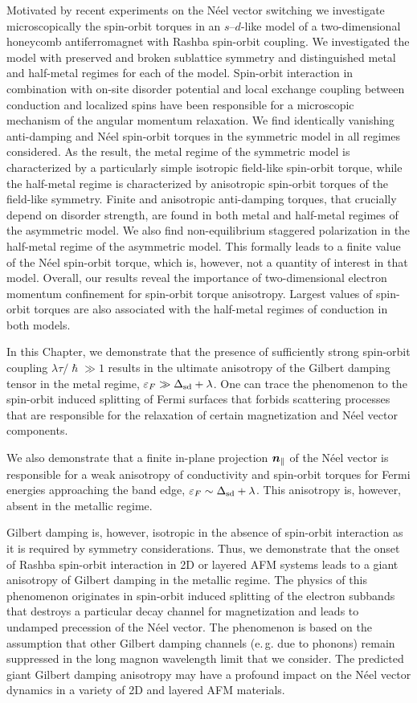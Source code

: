 Motivated by recent experiments on the N\'eel vector switching we investigate microscopically the spin-orbit torques in an $s$--$d$-like model of a two-dimensional honeycomb antiferromagnet with Rashba spin-orbit coupling. We investigated the model with preserved and broken sublattice symmetry and distinguished metal and half-metal regimes for each of the model. Spin-orbit interaction in combination with on-site disorder potential and local exchange coupling between conduction and localized spins have been responsible for a microscopic mechanism of the angular momentum relaxation. We find identically vanishing anti-damping and N\'eel spin-orbit torques in the symmetric model in all regimes considered. As the result, the metal regime of the symmetric model is characterized by a particularly simple isotropic field-like spin-orbit torque, while the half-metal regime is characterized by anisotropic spin-orbit torques of the field-like symmetry.  Finite and anisotropic anti-damping torques, that crucially depend on disorder strength, are found in both metal and half-metal regimes of the asymmetric model. We also find non-equilibrium staggered polarization in the half-metal regime of the asymmetric model. This formally leads to a finite value of the N\'eel spin-orbit torque, which is, however, not a quantity of interest in that model. Overall, our results reveal the importance of two-dimensional electron momentum confinement for spin-orbit torque anisotropy. Largest values of spin-orbit torques are also associated with the half-metal regimes of conduction in both models. 

In this Chapter, we demonstrate that the presence of sufficiently strong spin-orbit coupling $\lambda\tau/\hslash \gg 1$ results in the ultimate anisotropy of the Gilbert damping tensor in the metal regime, $\varepsilon_F\gg\Delta_{\text{sd}}+\lambda$.  One can trace the phenomenon to the spin-orbit induced splitting of Fermi surfaces that forbids scattering processes that are responsible for the relaxation of certain magnetization and N\'eel vector components. 

We also demonstrate that a finite in-plane projection $\boldsymbol{n}_\parallel$ of the N\'eel vector is responsible for a weak anisotropy of conductivity and spin-orbit torques for Fermi energies approaching the band edge, $\varepsilon_F \sim \Delta_{\text{sd}}+\lambda$. This anisotropy is, however, absent in the metallic regime. 

Gilbert damping is, however, isotropic in the absence of spin-orbit interaction as it is required by symmetry considerations. Thus, we demonstrate that the onset of Rashba spin-orbit interaction in 2D or layered AFM systems leads to a giant anisotropy of Gilbert damping in the metallic regime. The physics of this phenomenon originates in spin-orbit induced splitting of the electron subbands that destroys a particular decay channel for magnetization and leads to undamped precession of the N\'eel vector. The phenomenon is based on the assumption that other Gilbert damping channels  (e.\,g. due to phonons) remain suppressed in the long magnon wavelength limit that we consider. The predicted giant Gilbert damping anisotropy may have a profound impact on the N\'eel vector dynamics in a variety of 2D and layered AFM materials. 

